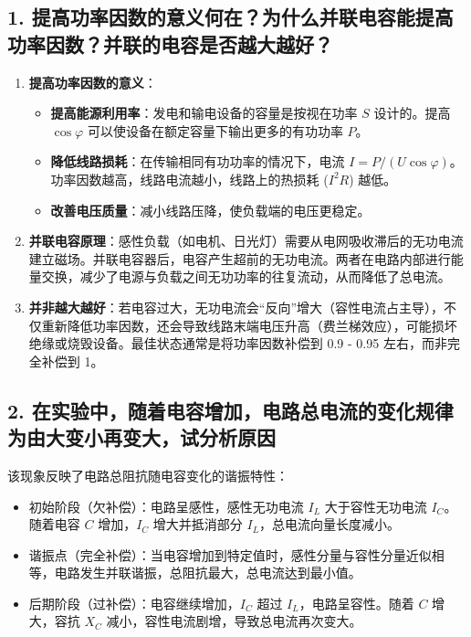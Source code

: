 \documentclass[]{../template/Report}%
\begin{document}
\begin{fullreportonly}
\subsection*{1. 提高功率因数的意义何在？为什么并联电容能提高功率因数？并联的电容是否越大越好？}
\begin{enumerate}
    \item \textbf{提高功率因数的意义}：
    \begin{itemize}
        \item \textbf{提高能源利用率}：发电和输电设备的容量是按视在功率 $S$ 设计的。提高 $\cos\varphi$ 可以使设备在额定容量下输出更多的有功功率 $P$。
        \item \textbf{降低线路损耗}：在传输相同有功功率的情况下，电流 $I = P/(U\cos\varphi)$。功率因数越高，线路电流越小，线路上的热损耗 ($I^2R$) 越低。
        \item \textbf{改善电压质量}：减小线路压降，使负载端的电压更稳定。
    \end{itemize}
    \item \textbf{并联电容原理}：感性负载（如电机、日光灯）需要从电网吸收滞后的无功电流建立磁场。并联电容器后，电容产生超前的无功电流。两者在电路内部进行能量交换，减少了电源与负载之间无功功率的往复流动，从而降低了总电流。
    \item \textbf{并非越大越好}：若电容过大，无功电流会“反向”增大（容性电流占主导），不仅重新降低功率因数，还会导致线路末端电压升高（费兰梯效应），可能损坏绝缘或烧毁设备。最佳状态通常是将功率因数补偿到 0.9 - 0.95 左右，而非完全补偿到 1。
\end{enumerate}

\subsection*{2. 在实验中，随着电容增加，电路总电流的变化规律为由大变小再变大，试分析原因}
该现象反映了电路总阻抗随电容变化的谐振特性：
\begin{itemize}
    \item 初始阶段（欠补偿）：电路呈感性，感性无功电流 $I_L$ 大于容性无功电流 $I_C$。随着电容 $C$ 增加，$I_C$ 增大并抵消部分 $I_L$，总电流向量长度减小。
    \item 谐振点（完全补偿）：当电容增加到特定值时，感性分量与容性分量近似相等，电路发生并联谐振，总阻抗最大，总电流达到最小值。
    \item 后期阶段（过补偿）：电容继续增加，$I_C$ 超过 $I_L$，电路呈容性。随着 $C$ 增大，容抗 $X_C$ 减小，容性电流剧增，导致总电流再次变大。
\end{itemize}


\end{fullreportonly}
\end{document}
